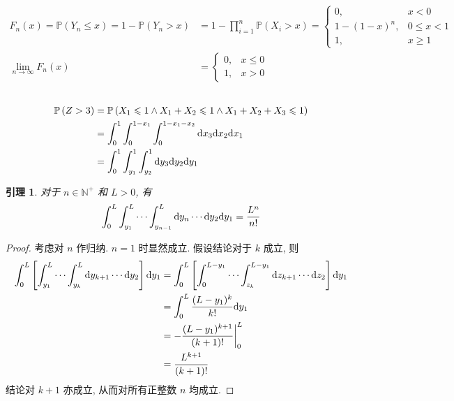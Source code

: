 \documentclass[8pt]{article}
\theoremstyle{compact}
\newtheorem{lemma}{引理}
\def\le{\leqslant}
\def\ge{\geqslant}
\def\P#1{\mathbb{P}\left({#1}\right)}
\begin{document}
\subsection{}
\begin{equation}
	\begin{split}
		F_n(x) = \P{Y_n \le x} = 1 - \P{Y_n > x} &= 1 - \prod_{i=1}^{n}\P{X_i > x} = \begin{cases}
			0, & x < 0\\
			1 - (1 - x)^n, & 0 \le x < 1\\
			1, & x \ge 1
		\end{cases}\\
		\lim_{n \to \infty}F_n(x) &= \begin{cases}
			0, & x \le 0 \\
			1, & x > 0
		\end{cases}
	\end{split}
\end{equation}
\subsection{}
\begin{equation}
	\begin{split}
		\P{Z > 3} &= \P{X_1 \le 1 \wedge X_1 + X_2 \le 1 \wedge X_1 + X_2 + X_3 \le 1}\\
		&= \int_{0}^{1}\int_{0}^{1 - x_1}\int_{0}^{1 - x_1 - x_2}\text dx_3 \text dx_2 \text dx_1\\
		&= \int_{0}^{1}\int_{y_1}^{1}\int_{y_2}^{1}\text dy_3 \text dy_2 \text dy_1
	\end{split}
\end{equation}

\begin{lemma}
	对于 $n \in \mathbb N^+$ 和 $L > 0$, 有\begin{equation}
		\int_{0}^{L}\int_{y_1}^{L}\cdots\int_{y_{n-1}}^{L}\text dy_n\cdots\text dy_2\text dy_1 = \frac{L^n}{n!}
	\end{equation}
\end{lemma}
\begin{proof}
	考虑对 $n$ 作归纳. $n = 1$ 时显然成立. 假设结论对于 $k$ 成立, 则
	\begin{equation}
		\begin{split}
			\int_{0}^{L}\left[\int_{y_1}^{L}\cdots\int_{y_k}^{L}\text dy_{k+1}\cdots\text dy_2\right]\text dy_1 &= \int_{0}^{L}\left[\int_{0}^{L - y_1}\cdots\int_{z_k}^{L - y_1}\text dz_{k+1}\cdots\text dz_2\right]\text dy_1\\
			&= \int_{0}^{L}\frac{(L - y_1)^k}{k!}\text dy_1\\
			&= -\frac{(L - y_1)^{k+1}}{(k+1)!}\bigg|_{0}^{L}\\
			&= \frac{L^{k+1}}{(k+1)!}
		\end{split}
	\end{equation}
	结论对 $k + 1$ 亦成立, 从而对所有正整数 $n$ 均成立.
\end{proof}
\end{document}
